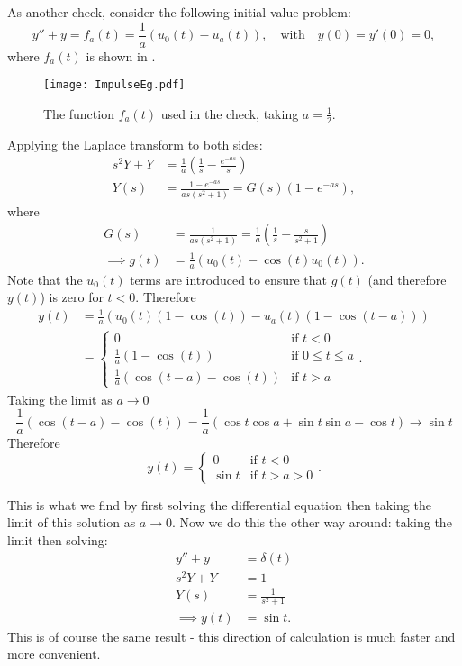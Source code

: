 As another check, consider the following initial value problem:
\[
y''+y = f_a(t) = \frac{1}{a}\left(u_0(t)-u_a(t)\right), \quad\text{with}\quad y(0)=y'(0)=0,
\]
where $f_a(t)$ is shown in .

\begin{figure}[H]
	\centering
	\texttt{[image: ImpulseEg.pdf]}
	\caption{The function $f_a(t)$ used in the check, taking $a=\frac12$.}
	\label{fig:impulseeg}
\end{figure}

Applying the Laplace transform to both sides:
\begin{align*}
	s^2Y + Y &= \frac{1}{a}\left(\frac{1}{s} - \frac{e^{-as}}{s}\right) \\
	Y(s) &= \frac{1-e^{-as}}{as(s^2+1)} = G(s)(1-e^{-as}),
\end{align*}
where
\begin{align*}
	G(s) &= \frac{1}{as(s^2+1)} = \frac{1}{a} \left(\frac{1}{s} - \frac{s}{s^2+1}\right) \\
	\implies g(t) &= \frac{1}{a} \left(u_0(t) - \cos(t)u_0(t)\right).
\end{align*}
Note that the $u_0(t)$ terms are introduced to ensure that $g(t)$ (and therefore $y(t)$) is zero for $t<0$. Therefore
\begin{align*}
	y(t) &= \frac{1}{a} \left(u_0(t)(1-\cos(t)) - u_a(t)(1-\cos(t-a))\right) \\
	&= \begin{cases}0 & \text{if }t<0 \\ \frac{1}{a}(1-\cos(t)) & \text{if } 0 \leq t \leq a \\ \frac{1}{a}(\cos(t-a)-\cos(t)) & \text{if } t>a \end{cases}.
\end{align*}
Taking the limit as $a \to 0$
\[
\frac{1}{a}(\cos(t-a)-\cos(t)) = \frac{1}{a}(\cos{t}\cos{a} + \sin{t}\sin{a} - \cos{t}) \to \sin{t}
\]
Therefore
\[
y(t) = \begin{cases}0 & \text{if } t<0 \\ \sin{t} & \text{if } t>a>0 \end{cases}.
\]

This is what we find by first solving the differential equation then taking the limit of this solution as $a \to 0$. Now we do this the other way around: taking the limit then solving:
\begin{align*}
	y'' + y &= \delta(t) \\
	s^2Y + Y &= 1 \\
	Y(s) &= \frac{1}{s^2+1} \\
	\implies y(t) &= \sin{t}.
\end{align*}
This is of course the same result - this direction of calculation is much faster and more convenient.

